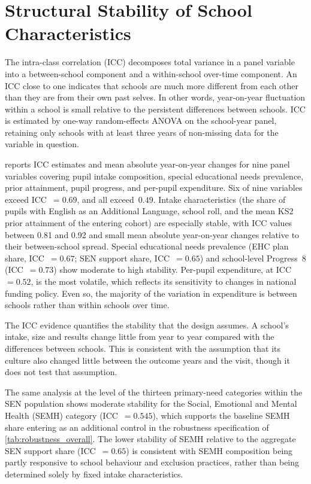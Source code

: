 \section{Structural Stability of School Characteristics}
\label{app:3A:stability}

The intra-class correlation (ICC) decomposes total variance in a panel variable
into a between-school component and a within-school over-time component. An ICC
close to one indicates that schools are much more different from each other
than they are from their own past selves. In other words, year-on-year
fluctuation within a school is small relative to the persistent differences
between schools. ICC is estimated by
one-way random-effects ANOVA on the school-year panel, retaining only schools
with at least three years of non-missing data for the variable in question.

 reports ICC estimates and mean absolute
year-on-year changes for nine panel variables covering pupil intake composition,
special educational needs prevalence, prior attainment, pupil progress, and
per-pupil expenditure. Six of nine variables exceed ICC~$= 0.69$, and all
exceed~$0.49$. Intake characteristics (the share of pupils with English as
an Additional Language, school roll, and the mean KS2 prior attainment of the
entering cohort) are especially stable, with ICC values between 0.81 and 0.92
and small mean absolute year-on-year changes relative to their between-school
spread.
Special educational needs prevalence (EHC plan share, ICC~$= 0.67$; SEN support
share, ICC~$= 0.65$) and school-level Progress~8 (ICC~$= 0.73$) show moderate to
high stability. Per-pupil expenditure, at ICC~$= 0.52$, is the most volatile, which
reflects its sensitivity to changes in national funding policy. Even so, the
majority of the variation in expenditure is between schools rather than
within schools over time.

The ICC evidence quantifies the stability that the design assumes. A school's intake, size and results change little from year to year compared with the differences between schools. This is consistent with the assumption that its culture also changed little between the outcome years and the visit, though it does not test that assumption.

The same analysis at the level of the thirteen primary-need categories
within the SEN population shows moderate stability for the Social, Emotional
and Mental Health (SEMH) category (ICC~$= 0.545$), which supports the
baseline SEMH share entering as an additional control in the robustness
specification of \cref{tab:robustness_overall}. The lower stability of SEMH
relative to the aggregate SEN support share (ICC~$= 0.65$) is consistent
with SEMH composition being partly responsive to school behaviour and
exclusion practices, rather than being determined solely by fixed intake
characteristics.

